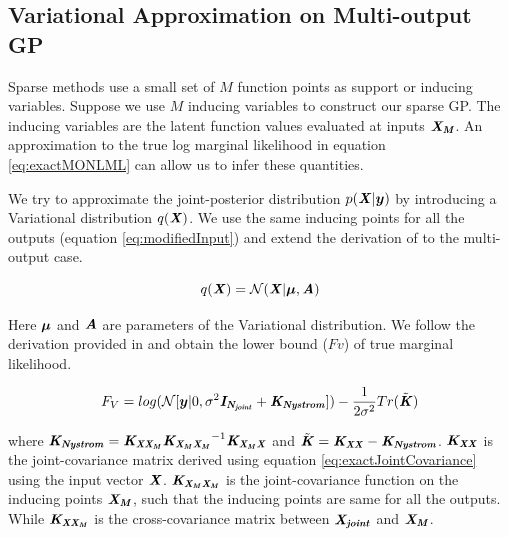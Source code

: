 \subsection{Variational Approximation on Multi-output GP}\label{sec:varMOGP}
Sparse methods use a small set of \(M\) function points as support or inducing variables. Suppose we use \(M\) inducing variables to construct our sparse GP. The inducing variables are the latent function values evaluated at inputs \(\bm{\mathit{X_{M}}}\). An approximation to the true log marginal likelihood in equation \ref{eq:exactMONLML} can allow us to infer these quantities.

We try to approximate the joint-posterior distribution \(p(\bm{\mathit{X}}| \boldsymbol{y})\) by introducing a Variational distribution \(q(\bm{\mathit{X}})\). We use the same inducing points for all the outputs (equation \ref{eq:modifiedInput}) and extend the derivation of \cite{Titsias09variationallearning} to the multi-output case. 

\begin{equation}\label{eq:multiVariationalQ}
 q(\bm{\mathit{X}}) = \mathcal{N}(\bm{\mathit{X}} |  \boldsymbol{\mu}, \bm{\mathit{A}})
\end{equation}
 
Here \( \boldsymbol{\mu}\) and \(\bm{\mathit{A}}\) are parameters of the Variational distribution. We follow the derivation provided in \cite{Titsias09variationallearning} and obtain the lower bound ($Fv$) of true marginal likelihood.

\begin{equation}\label{eq:lowerBoundMultiVarNLML}
F_{V} = log(\mathcal{N}[\boldsymbol{y}| 0, \sigma ^{2}\bm{\mathit{I_{N_{joint}}}} + \bm{\mathit{K_{Nystrom}}}]) - \frac{1}{2\sigma ^{2}}Tr(\tilde{\bm{\mathit{K}}})
\end{equation}

where \(\bm{\mathit{K_{Nystrom}}} = \bm{\mathit{K_{XX_{M}}}}\bm{\mathit{K_{X_{M}X_{M}}}}^{-1}\bm{\mathit{K_{X_{M}X}}}\) and \(\tilde{\bm{\mathit{K}}} = \bm{\mathit{K_{XX}}} - \bm{\mathit{K_{Nystrom}}}\). \(\bm{\mathit{K_{XX}}}\) is the joint-covariance matrix derived using equation \ref{eq:exactJointCovariance} using the input vector \(\bm{\mathit{X}}\). \(\bm{\mathit{K_{X_{M}X_{M}}}}\) is the joint-covariance function on the inducing points \(\bm{\mathit{X_{M}}}\), such that the inducing points are same for all the outputs. While \(\bm{\mathit{K_{XX_{M}}}}\) is the cross-covariance matrix between \(\bm{\mathit{X_{joint}}}\) and \(\bm{\mathit{X_{M}}}\). 

